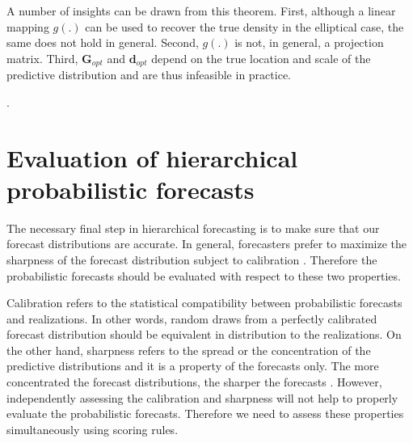 \documentclass[a4paper, 11pt]{article}
\theoremstyle{theo}
\theoremstyle{definition}
\begin{document}
A number of insights can be drawn from this theorem.  First, although a linear mapping $g(.)$ can be used to recover the true density in the elliptical case, the same does not hold in general.  Second, $g(.)$ is not, in general, a projection matrix.  Third, ${\bm G}_{opt}$ and ${\bm d}_{opt}$ depend on the true location and scale of the predictive distribution and are thus infeasible in practice.  

.


\section{Evaluation of hierarchical probabilistic forecasts}\label{sec:evaluation}

The necessary final step in hierarchical forecasting is to make sure that our forecast distributions are accurate. In general, forecasters prefer to maximize the sharpness of the forecast distribution subject to calibration \citep{Gneiting2014}. Therefore the probabilistic forecasts should be evaluated with respect to these two properties.

Calibration refers to the statistical compatibility between probabilistic forecasts and realizations. In other words, random draws from a perfectly calibrated forecast distribution should be equivalent in distribution to the realizations. On the other hand, sharpness refers to the spread or the concentration of the predictive distributions and it is a property of the forecasts only. The more concentrated the forecast distributions, the sharper the forecasts \citep{Gneiting2008}. However, independently assessing the calibration and sharpness will not help to properly evaluate the probabilistic forecasts. Therefore we need to assess these properties simultaneously using scoring rules.
\end{document}
